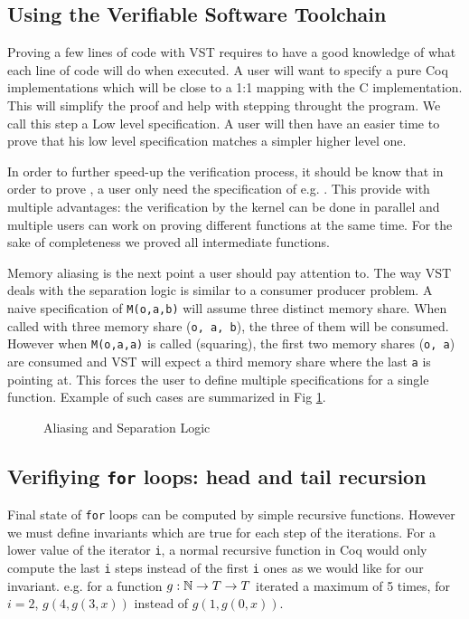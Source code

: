 \subsection{Using the Verifiable Software Toolchain}

Proving a few lines of code with VST requires to have a good knowledge of what
each line of code will do when executed. A user will want to specify a pure Coq
implementations which will be close to a 1:1 mapping with the C implementation.
This will simplify the proof and help with stepping throught the program.
We call this step a Low level specification. A user will then have an easier
time to prove that his low level specification matches a simpler higher level one.

In order to further speed-up the verification process, it should be know that
in order to prove , a user only need the specification
of e.g. . This provide with multiple advantages: the verification by the
kernel can be done in parallel and multiple users can work on proving different
functions at the same time. For the sake of completeness we proved all intermediate
functions.

Memory aliasing is the next point a user should pay attention to. The way VST
deals with the separation logic is similar to a consumer producer problem.
A naive specification of \texttt{M(o,a,b)} will assume three distinct memory share.
When called with three memory share (\texttt{o, a, b}), the three of them will be consumed.
However when \texttt{M(o,a,a)} is called (squaring), the first two memory shares (\texttt{o, a})
are consumed and VST will expect a third memory share where the last \texttt{a} is pointing at.
This forces the user to define multiple specifications for a single function.
Example of such cases are summarized in Fig \ref{tk:MemSame}.
\begin{figure}[h]
  
  \caption{Aliasing and Separation Logic}
  \label{tk:MemSame}
\end{figure}

\subsection{Verifiying \texttt{for} loops: head and tail recursion}

Final state of \texttt{for} loops can be computed by simple recursive functions.
However we must define invariants which are true for each step of the iterations.
For a lower value of the iterator \texttt{i}, a normal recursive function in Coq
would only compute the last \texttt{i} steps instead of the first \texttt{i} ones
as we would like for our invariant.
e.g. for a function $g : \mathbb{N} \rightarrow T  \rightarrow T $ iterated a maximum of
5 times, for $i = 2$, $g(4, g(3, x))$ instead of $g(1, g(0 , x))$.

